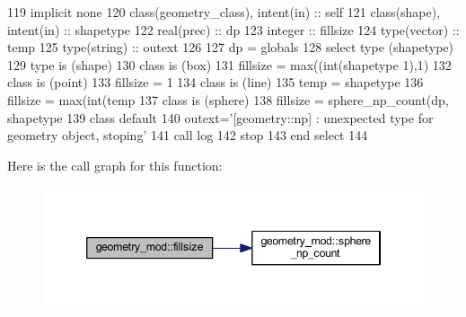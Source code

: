\begin{DoxyCode}
119     \textcolor{keywordtype}{implicit none}
120     \textcolor{keywordtype}{class}(geometry\_class), \textcolor{keywordtype}{intent(in)} :: self
121     \textcolor{keywordtype}{class}(shape), \textcolor{keywordtype}{intent(in)} :: shapetype
122     \textcolor{keywordtype}{real(prec)} :: dp
123     \textcolor{keywordtype}{integer} :: fillsize
124     \textcolor{keywordtype}{type}(vector) :: temp
125     \textcolor{keywordtype}{type}(string) :: outext
126 
127     dp = globals%
128     \textcolor{keywordflow}{select type} (shapetype)
129 \textcolor{keywordflow}{    type is} (shape)
130 \textcolor{keywordflow}{    class is} (box)
131         fillsize = max((int(shapetype%
      1),1)
132 \textcolor{keywordflow}{    class is} (point)
133         fillsize = 1
134 \textcolor{keywordflow}{    class is} (line)
135         temp = shapetype%
136         fillsize = max(int(temp%
137 \textcolor{keywordflow}{    class is} (sphere)
138         fillsize = sphere\_np\_count(dp, shapetype%
139 \textcolor{keywordflow}{        class default}
140         outext=\textcolor{stringliteral}{'[geometry::np] : unexpected type for geometry object, stoping'}
141         \textcolor{keyword}{call }log%
142         stop
143 \textcolor{keywordflow}{    end select}
144 
\end{DoxyCode}
Here is the call graph for this function\+:\nopagebreak
\begin{figure}[H]
\begin{center}
\leavevmode
\includegraphics[width=346pt]{namespacegeometry__mod_a92602e1198d3607613ea2722fb002685_cgraph}
\end{center}
\end{figure}
\mbox{\label{namespacegeometry__mod_ab591f293deeeb5426b9f14865cc2df67}} 
